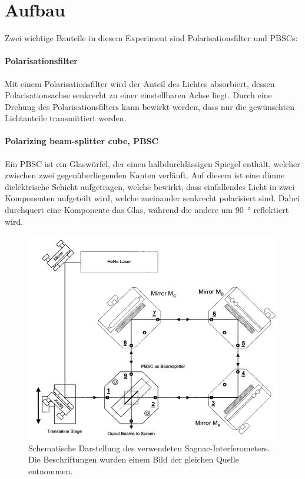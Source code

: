 \section{Aufbau}

Zwei wichtige Bauteile in diesem Experiment sind Polarisationsfilter und PBSCs:

\paragraph{Polarisationsfilter}
Mit einem Polarisationsfilter wird der Anteil des Lichtes absorbiert, dessen Polarisationsachse senkrecht zu einer einstellbaren Achse liegt. Durch eine Drehung des Polarisationsfilters kann bewirkt werden, dass nur die gewünschten Lichtanteile transmittiert werden.

\paragraph{Polarizing beam-splitter cube, PBSC}
\label{par:pbsc}
Ein PBSC ist ein Glaswürfel, der einen halbdurchlässigen Spiegel enthält, welcher zwischen zwei gegenüberliegenden Kanten verläuft. Auf diesem ist eine dünne dielektrische Schicht aufgetragen, welche bewirkt, dass einfallendes Licht in zwei Komponenten aufgeteilt wird, welche zueinander senkrecht polarisiert sind. Dabei durchquert eine Komponente das Glas, während die andere um \SI{90}{\degree} reflektiert wird.



\begin{figure}
\centering
\includegraphics[width=0.7\linewidth]{img/aufbau.png}
\caption{Schematische Darstellung des verwendeten Sagnac-Interferometers. Die Beschriftungen wurden einem Bild der gleichen Quelle entnommen. \cite{V64}}
\label{fig:aufbau}
\end{figure}


